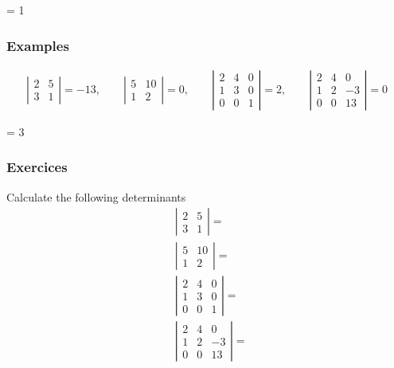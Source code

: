 \documentclass[usenames,dvipsnames,aspectratio=169,10pt]{beamer}
\def \EXAMPLEVERSION {1} %
\numberwithin{equation}{section}
\begin{document}
\ifnum \EXAMPLEVERSION = 1
\begin{frame}
\frametitle{Examples}
\begin{align*}
\left|\begin{matrix}
2 & 5 \\ 3 & 1
\end{matrix}\right|=-13
,\qquad
\left|\begin{matrix}
5 & 10 \\ 1 & 2
\end{matrix}\right|=0
,\qquad
\left|\begin{matrix}
2 & 4 & 0 \\ 1 & 3 & 0 \\ 0 & 0 & 1
\end{matrix}\right|=2
,\qquad
\left|\begin{matrix}
2 & 4 & 0 \\ 1 & 2 & -3 \\ 0 & 0 & 13
\end{matrix}\right|=0
\end{align*}
\end{frame}
\fi 


\ifnum \EXAMPLEVERSION = 3
\begin{frame}
\frametitle{Exercices}
\begin{minipage}{0.4\textwidth}
Calculate the following determinants
\begin{align*}
& \left|\begin{matrix}
2 & 5 \\ 3 & 1
\end{matrix}\right| = 
\\
& \left|\begin{matrix}
5 & 10 \\ 1 & 2
\end{matrix}\right| = 
\\
& \left|\begin{matrix}
2 & 4 & 0 \\ 1 & 3 & 0 \\ 0 & 0 & 1
\end{matrix}\right| = 
\\
& \left|\begin{matrix}
2 & 4 & 0 \\ 1 & 2 & -3 \\ 0 & 0 & 13
\end{matrix}\right| =
\end{align*}
\end{minipage}
\end{frame}
\fi 
\end{document}
